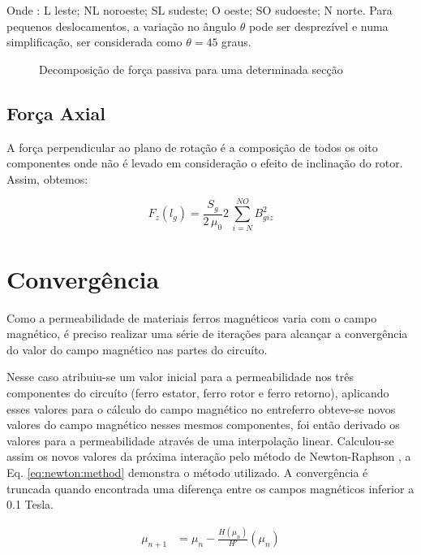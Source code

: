 Onde : L leste; NL noroeste; SL sudeste; O oeste; SO sudoeste; N norte. Para pequenos deslocamentos, a variação no ângulo $\theta$ pode ser desprezível e numa simplificação, ser considerada como $\theta = 45$ graus.

\begin{figure}[!ht]
	\centering
	
	\caption{Decomposição de força passiva para uma determinada secção}
	\label{fig:Passivo:decomposicao}
\end{figure}

\subsection{Força Axial}

A força perpendicular ao plano de rotação é a composição de todos os oito componentes onde não é levado em consideração o efeito de inclinação do rotor. Assim, obtemos:

\begin{equation}
F_z(l_g) = \frac{S_{g}}{2 \, \mu_0} 	2 \,\sum_{i=N}^{NO} B_{giz}^2
\end{equation}

\section{Convergência}

Como a permeabilidade de materiais ferros magnéticos varia com o campo magnético, é preciso realizar uma série de iterações para alcançar a convergência do valor do campo magnético nas partes do circuíto. 

Nesse caso atribuiu-se um valor inicial para a permeabilidade nos três componentes do circuíto (ferro estator, ferro rotor e ferro retorno), aplicando esses valores para o cálculo do campo magnético no entreferro obteve-se novos valores do campo magnético nesses mesmos componentes, foi então derivado os valores para a permeabilidade através de uma interpolação linear. Calculou-se assim os novos valores da próxima interação pelo método de  Newton-Raphson \citep{Ortner2010}, a Eq. \ref{eq:newton:method} demonstra o método utilizado. A convergência é truncada quando encontrada uma diferença entre os campos magnéticos inferior a 0.1 Tesla. 

\begin{align}
	\mu_{n+1} &= \mu_n - \frac{H(\mu_n)}{H'}(\mu_n)
	\label{eq:newton:method}
\end{align} 



